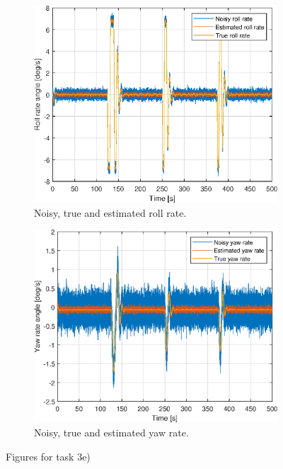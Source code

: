 \begin{figure}[ht]
\begin{subfigure}[b]{0.45\textwidth}
		\includegraphics[width=\textwidth]{figures/3e/roll_rate_p.eps}
		\caption{Noisy, true and estimated roll rate. }
		\label{fig:3e_roll_rate_p}
	\end{subfigure}
	\begin{subfigure}[b]{0.45\textwidth}
		\includegraphics[width=\textwidth]{figures/3e/yaw_rate_r.eps}
		\caption{Noisy, true and estimated yaw rate. }
		\label{fig:3e_yaw_rate_r}
	\end{subfigure}
	\caption{Figures for task 3e)}\label{fig:3e}
\end{figure}

